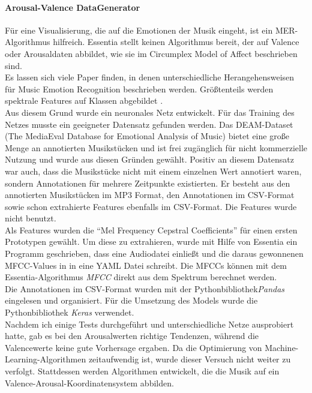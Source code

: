 \documentclass[11pt,a4paper]{article}
\begin{document}
\paragraph{Arousal-Valence DataGenerator}
\label{sec:AVDataGenerator}
Für eine Visualisierung, die auf die Emotionen der Musik eingeht, ist ein MER-Algorithmus hilfreich. Essentia stellt keinen Algorithmus bereit, der auf Valence oder Arousaldaten abbildet, wie sie im Circumplex Model of Affect beschrieben sind.\\
Es lassen sich viele Paper finden, in denen unterschiedliche Herangehensweisen für Music Emotion Recognition beschrieben werden. Größtenteils werden spektrale Features auf Klassen abgebildet \cite[S. 159]{lerch2012introduction}.\\
Aus diesem Grund wurde ein neuronales Netz entwickelt. Für das Training des Netzes musste ein geeigneter Datensatz gefunden werden. Das DEAM-Dataset (The MediaEval Database for Emotional Analysis of Music) bietet eine große Menge an annotierten Musikstücken und ist frei zugänglich für nicht kommerzielle Nutzung \cite{AlajankiEmoInMusicAnalysis} und wurde aus diesen Gründen gewählt. Positiv an diesem Datensatz war auch, dass die Musikstücke nicht mit einem einzelnen Wert annotiert waren, sondern Annotationen für mehrere Zeitpunkte existierten. Er besteht aus den annotierten Musikstücken im MP3 Format, den Annotationen im CSV-Format sowie schon extrahierte Features ebenfalls im CSV-Format. Die Features wurde nicht benutzt.\\
Als Features wurden die ``Mel Frequency Cepstral Coefficients'' für einen ersten Prototypen gewählt. Um diese zu extrahieren, wurde mit Hilfe von Essentia ein Programm geschrieben, dass eine Audiodatei einließt und die daraus gewonnenen MFCC-Values in in eine YAML Datei schreibt. Die MFCCs können mit dem Essentia-Algorithmus \textit{MFCC} direkt aus dem Spektrum berechnet werden.\\
Die Annotationen im CSV-Format wurden mit der Pythonbibliothek\textit{Pandas}\cite{pandasDoc} eingelesen und organisiert. Für die Umsetzung des Models wurde die Pythonbibliothek \textit{Keras}\cite{kerasDoc} verwendet.\\
Nachdem ich einige Tests durchgeführt und unterschiedliche Netze ausprobiert hatte, gab es bei den Arousalwerten richtige Tendenzen, während die Valencewerte keine gute Vorhersage ergaben. Da die Optimierung von Machine-Learning-Algorithmen zeitaufwendig ist, wurde dieser Versuch nicht weiter zu verfolgt. Stattdessen werden Algorithmen entwickelt, die die Musik auf ein Valence-Arousal-Koordinatensystem abbilden.
\end{document}
